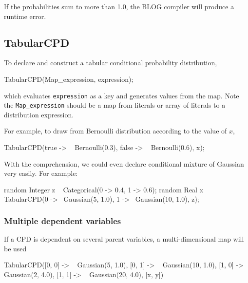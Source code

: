 \documentclass[12pt]{article}
\begin{document}
If the probabilities sum to more than 1.0, the BLOG compiler will produce a runtime error.


\subsection{TabularCPD}
To declare and construct a tabular conditional probability distribution, 
\begin{blogcode}
TabularCPD(Map_expression, expression);
\end{blogcode}
which evaluates \verb|expression| as a key and generates values from the map. Note the \verb|Map_expression| should be a map from literals or array of literals to a distribution expression. 

For example, to draw from Bernoulli distribution according to the value of $x$, 
\begin{blogcode}
TabularCPD({true -> ~ Bernoulli(0.3), 
            false -> ~ Bernoulli(0.6)}, x);
\end{blogcode}

With the comprehension, we could even declare conditional mixture of Gaussian very easily. For example:
\begin{blogcode}
random Integer z ~ Categorical({0 -> 0.4, 1 -> 0.6});
random Real x ~ TabularCPD({0 -> ~Gaussian(5, 1.0), 
                 1 -> ~Gaussian(10, 1.0)}, z);
\end{blogcode}

\subsubsection{Multiple dependent variables}
If a CPD is dependent on several parent variables, a multi-dimensional map will be used
\begin{blogcode}
TabularCPD({[0, 0] -> ~ Gaussian(5, 1.0), 
            [0, 1] -> ~ Gaussian(10, 1.0),
            [1, 0] -> ~ Gaussian(2, 4.0),
            [1, 1] -> ~ Gaussian(20, 4.0)}, [x, y])
\end{blogcode}

\end{document}
